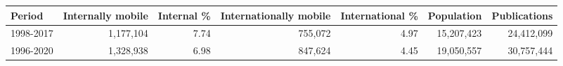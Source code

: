 \begin{tabular}{lrrrrrr}
\hline
 Period    &   Internally mobile &   Internal \% &   Internationally mobile &   International \% &   Population &   Publications \\
\hline
 1998-2017 &           1,177,104 &         7.74 &                  755,072 &              4.97 &   15,207,423 &     24,412,099 \\
 1996-2020 &           1,328,938 &         6.98 &                  847,624 &              4.45 &   19,050,557 &     30,757,444 \\
\hline
\end{tabular}